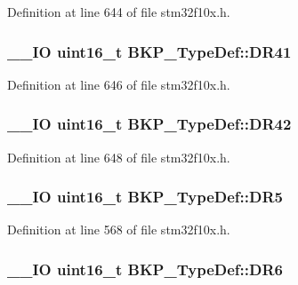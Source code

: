 Definition at line 644 of file stm32f10x.\-h.

\hypertarget{struct_b_k_p___type_def_a9e9b72b388e2ed718df333cfb9e90226}{
\subsubsection[{D\-R41}]{\setlength{\rightskip}{0pt plus 5cm}\-\_\-\-\_\-\-I\-O {\bf uint16\-\_\-t} B\-K\-P\-\_\-\-Type\-Def\-::\-D\-R41}}\label{struct_b_k_p___type_def_a9e9b72b388e2ed718df333cfb9e90226}


Definition at line 646 of file stm32f10x.\-h.

\hypertarget{struct_b_k_p___type_def_af7a01e3a3e1be76ebb8100e7ff6de9c0}{
\subsubsection[{D\-R42}]{\setlength{\rightskip}{0pt plus 5cm}\-\_\-\-\_\-\-I\-O {\bf uint16\-\_\-t} B\-K\-P\-\_\-\-Type\-Def\-::\-D\-R42}}\label{struct_b_k_p___type_def_af7a01e3a3e1be76ebb8100e7ff6de9c0}


Definition at line 648 of file stm32f10x.\-h.

\hypertarget{struct_b_k_p___type_def_a35b107064600b60af1c42a5e5a6a16c1}{
\subsubsection[{D\-R5}]{\setlength{\rightskip}{0pt plus 5cm}\-\_\-\-\_\-\-I\-O {\bf uint16\-\_\-t} B\-K\-P\-\_\-\-Type\-Def\-::\-D\-R5}}\label{struct_b_k_p___type_def_a35b107064600b60af1c42a5e5a6a16c1}


Definition at line 568 of file stm32f10x.\-h.

\hypertarget{struct_b_k_p___type_def_a127b4555819656767655092cf43a4ae9}{
\subsubsection[{D\-R6}]{\setlength{\rightskip}{0pt plus 5cm}\-\_\-\-\_\-\-I\-O {\bf uint16\-\_\-t} B\-K\-P\-\_\-\-Type\-Def\-::\-D\-R6}}\label{struct_b_k_p___type_def_a127b4555819656767655092cf43a4ae9}


